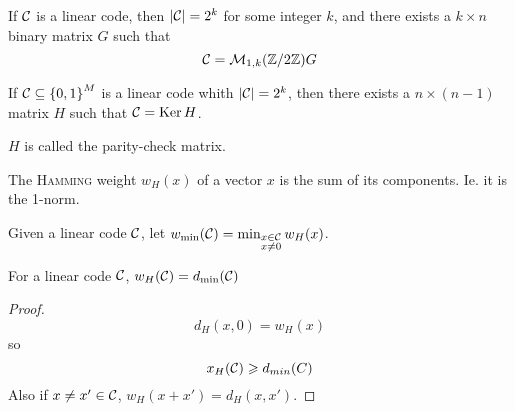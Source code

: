 \begin{proposition}
    If $\mathcal{C}$ is a linear code, then $\left\lvert\mathcal{C}\right\rvert = 2^k$ for some integer $k$, and there exists a $k\times n$ binary matrix $G$ such that
    \[
        \mathcal{C} = \mathcal{M}_{1,k}(\mathbb{Z}/2\mathbb{Z})G    
    \]
\end{proposition}

\begin{proposition}
    If $\mathcal{C}\subseteq \left\{ 0,1 \right\}^M$ is a linear code whith $\left\lvert\mathcal{C}\right\rvert = 2^k$, then there exists a $n\times(n-1)$ matrix $H$ such that $\mathcal{C} = \operatorname{Ker} H$.
\end{proposition}

$H$ is called the parity-check matrix.

\begin{definition}
    The \textsc{Hamming} weight $w_H(x)$ of a vector $x$ is the sum of its components. Ie. it is the 1-norm.
\end{definition}

\begin{definition}
    Given a linear code $\mathcal{C}$, let $w_{\min}(\mathcal{C}) = \min_{\substack{x\in\mathcal{C}\\x\neq 0}}w_H(x)$.
\end{definition}

\begin{theorem}
    For a linear code $\mathcal{C}$, $w_H(\mathcal{C}) = d_{\min}(\mathcal{C})$
\end{theorem}
\begin{proof}
    \[
        d_H(x,0) = w_H(x)
    \]
    so
    \[
        x_H(\mathcal{C}) \geqslant d_{min}(C)
    \]
    Also if $x\neq x' \in \mathcal{C}$, $w_H(x+x') = d_H(x,x')$.
\end{proof}

